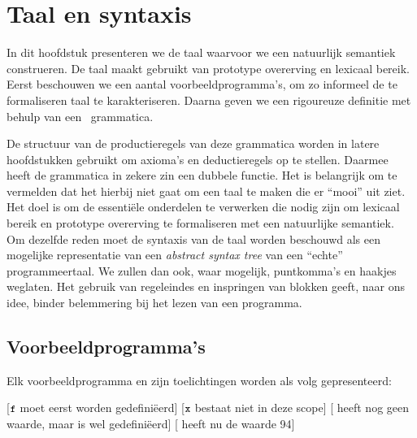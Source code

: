 
\chapter{Taal en syntaxis}

In dit hoofdstuk presenteren we de taal waarvoor we een natuurlijk semantiek construeren. De taal maakt gebruikt van prototype overerving en lexicaal bereik. Eerst beschouwen we een aantal voorbeeldprogramma's, om zo informeel de te formaliseren taal te karakteriseren. Daarna geven we een rigoureuze definitie met behulp van een \BNF\ grammatica.

De structuur van de productieregels van deze grammatica worden in latere hoofdstukken gebruikt om axioma's en deductieregels op te stellen. Daarmee heeft de grammatica in zekere zin een dubbele functie.
Het is belangrijk om te vermelden dat het hierbij niet gaat om een taal te maken die er ``mooi'' uit ziet. Het doel is om de essentiële onderdelen te verwerken die nodig zijn om lexicaal bereik en prototype overerving te formaliseren met een natuurlijke semantiek. Om dezelfde reden moet de syntaxis van de taal worden beschouwd als een mogelijke representatie van een \emph{abstract syntax tree} van een ``echte'' programmeertaal. We zullen dan ook, waar mogelijk, puntkomma's en haakjes weglaten. Het gebruik van regeleindes en inspringen van blokken geeft, naar ons idee, binder belemmering bij het lezen van een programma.%

\section{Voorbeeldprogramma's}
\label{sec:voorbeelden}

Elk voorbeeldprogramma en zijn toelichtingen worden als volg gepresenteerd:

\begin{NoBreak}
\codeFragmentCaption
\begin{codelines}
  [$\text{\ttfamily\small\upshape f}$ moet eerst worden gedefiniëerd]
  \codeLine{}[$\text{\ttfamily\small\upshape x}$ bestaat niet in deze scope]
  [ heeft nog geen waarde, maar is wel gedefiniëerd]
  [ heeft nu de waarde 94]
\end{codelines}
\end{NoBreak}


